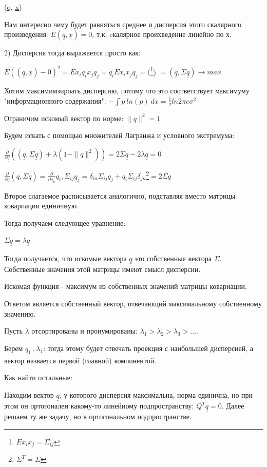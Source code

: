 \documentclass[a4paper, 12pt]{article}
\begin{document}
	(\underline{q}, \underline{x})
	
	Нам интересно чему будет равняться среднее и дисперсия этого скалярного произведения: $E(\underline{q}, \underline{x})=0$, т.к. cкалярное проихведение линейно по х. 
	
	2) Дисперсия тогда выражается просто как:
	
	$E((\underline{q}, \underline{x})-0)^2= Ex_iq_ix_jq_j = q_iEx_ix_jq_j = ($\footnote{$Ex_ix_j = \Sigma_{ij}$}) $= (\underline{q}, \Sigma \underline{q}) \rightarrow max$
	
	Хотим максимимзироать дисперсию, потому что это соответствует максимуму "информационного содержания": $-\int p \:ln (p)\: dx = \frac{1}{2} ln 2 \pi e \sigma^2$
	
	Ограничим искомый вектор по норме: $\|q\|^2=1$
	
	Будем искать с помощью множителей Лагранжа и условного экстремума:
	
	$\frac{\partial }{\partial \underline{q}}((\underline{q}, \Sigma \underline{q}) + \lambda (1 - \|q\|^2)) = 2 \Sigma\underline{q} - 2 \lambda \underline{q} = 0$ 
	
	$\frac{\partial }{\partial \underline{q}}(\underline{q}, \Sigma \underline{q})  = \frac{\partial }{\partial q_n}q_i, \Sigma_{ij} q_j =\delta_{in}\Sigma_{ij} q_j + q_i\Sigma_{ij}\delta_{jn} $\footnote{$\Sigma^T = \Sigma$}$ =2\Sigma\underline{q}$
	
	Второе слагаемое расписывается аналогично, подставляя вместо матрицы ковариации единичную.
	
	Тогда получаем следующее уравнение:
	
	$\Sigma \underline{q} = \lambda \underline{q}$
	
	Тогда получается, что искомые вектора $\underline{q}$ это собственные вектора $\Sigma$. Собственные значения этой матрицы имеют смысл дисперсии.
	
	Искомая функция - максимум из собственных значений матрицы ковариации. 
	
	Ответом является собственный вектор, отвечающий максимальному собственному значению.
	
	Пусть $\lambda$ отсортированы и пронумированы: $\lambda_1 > \lambda_2 >\lambda_3 >....$
	
	Берем $\underline{q_1}\:, \lambda_1$: тогда этому будет отвечать проекция с наибольшей дисперсией, а вектор назвается первой (главной) компонентой.
	
	Как найти остальные: 
	
	Находим вектор $\underline{q}$, у которого дисперсия максимальна, норма единична, но при этом он ортогонален какому-то линейному подпространству: $Q^T\underline{q} = 0$. Далее решаем ту же задачу, но в ортогональном подпространстве.
	
\end{document}
